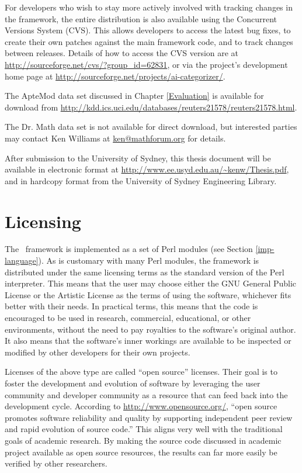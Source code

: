 For developers who wish to stay more actively involved with tracking
changes in the framework, the entire distribution is also available
using the Concurrent Versions System (CVS).  This allows developers to
access the latest bug fixes, to create their own patches against the
main framework code, and to track changes between releases.  Details
of how to access the CVS version are at
\url{http://sourceforge.net/cvs/?group_id=62831}, or via the project's
development home page at
\url{http://sourceforge.net/projects/ai-categorizer/}.

The ApteMod data set discussed in Chapter \ref{Evaluation} is
available for download from
\url{http://kdd.ics.uci.edu/databases/reuters21578/reuters21578.html}.

The Dr. Math data set is not available for direct download, but
interested parties may contact Ken Williams at \url{ken@mathforum.org}
for details.

After submission to the University of Sydney, this thesis document
will be available in electronic format at
\url{http://www.ee.usyd.edu.au/~kenw/Thesis.pdf}, and in hardcopy
format from the University of Sydney Engineering Library.

\section*{Licensing}

The \aicat\ framework is implemented as a set of Perl modules (see
Section \ref{imp-language}).  As is customary with many Perl modules,
the framework is distributed under the same licensing terms as the
standard version of the Perl interpreter.  This means that the user
may choose either the GNU General Public License or the Artistic
License as the terms of using the software, whichever fits better with
their needs.  In practical terms, this means that the code is
encouraged to be used in research, commercial, educational, or other
environments, without the need to pay royalties to the software's
original author.  It also means that the software's inner workings are
available to be inspected or modified by other developers for their
own projects.

Licenses of the above type are called ``open source'' licenses.  Their
goal is to foster the development and evolution of software by
leveraging the user community and developer community as a resource
that can feed back into the development cycle.  According to
\url{http://www.opensource.org/}, ``open source promotes software
reliability and quality by supporting independent peer review and
rapid evolution of source code.''  This aligns very well with the
traditional goals of academic research.  By making the source code
discussed in academic project available as open source resources, the
results can far more easily be verified by other researchers.

